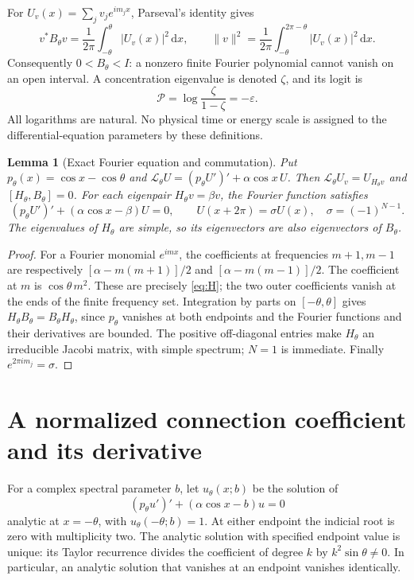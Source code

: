 \documentclass[10pt]{article}
\newtheorem{lemma}[theorem]{Lemma}
\newcommand{\dd}{\mathrm d}
\begin{document}
For $U_v(x)=\sum_j v_j e^{im_jx}$, Parseval's identity gives
\begin{equation}
v^*B_\theta v=\frac1{2\pi}\int_{-\theta}^{\theta}|U_v(x)|^2\,\dd x,
\qquad
\|v\|^2=\frac1{2\pi}\int_{-\theta}^{2\pi-\theta}|U_v(x)|^2\,\dd x.
\label{eq:parseval}
\end{equation}
Consequently $0<B_\theta<I$: a nonzero finite Fourier polynomial cannot
vanish on an open interval. A concentration eigenvalue is denoted $\zeta$,
and its logit is
\begin{equation}
\mathcal P=\log\frac{\zeta}{1-\zeta}=-\varepsilon.
\label{eq:logit}
\end{equation}
All logarithms are natural. No physical time or energy scale is assigned
to the differential-equation parameters by these definitions.

\begin{lemma}[Exact Fourier equation and commutation]
Put $p_\theta(x)=\cos x-\cos\theta$ and
$\mathcal L_\theta U=(p_\theta U')'+\alpha\cos x\,U$.
Then $\mathcal L_\theta U_v=U_{H_\theta v}$ and
$[H_\theta,B_\theta]=0$.
For each eigenpair $H_\theta v=\beta v$, the Fourier function satisfies
\begin{equation}
(p_\theta U')'+(\alpha\cos x-\beta)U=0,\qquad
U(x+2\pi)=\sigma U(x),\quad \sigma=(-1)^{N-1}.
\label{eq:ode}
\end{equation}
The eigenvalues of $H_\theta$ are simple, so its eigenvectors are also
eigenvectors of $B_\theta$.
\end{lemma}
\begin{proof}
For a Fourier monomial $e^{imx}$, the coefficients at frequencies $m+1,m-1$
are respectively $[\alpha-m(m+1)]/2$ and $[\alpha-m(m-1)]/2$.
The coefficient at $m$ is $\cos\theta\,m^2$. These are precisely
\eqref{eq:H}; the two outer coefficients vanish at the ends of the finite
frequency set. Integration by parts on $[-\theta,\theta]$ gives
$H_\theta B_\theta=B_\theta H_\theta$, since $p_\theta$ vanishes at
both endpoints and the Fourier functions and their derivatives are bounded.
The positive off-diagonal entries make $H_\theta$ an irreducible Jacobi
matrix, with simple spectrum; $N=1$ is immediate.
Finally $e^{2\pi i m_j}=\sigma$.
\end{proof}

\section{A normalized connection coefficient and its derivative}
For a complex spectral parameter $b$, let $u_\theta(x;b)$ be the solution of
\begin{equation}
(p_\theta u')'+(\alpha\cos x-b)u=0
\label{eq:param}
\end{equation}
analytic at $x=-\theta$, with $u_\theta(-\theta;b)=1$.
At either endpoint the indicial root is zero with multiplicity two.
The analytic solution with specified endpoint value is unique:
its Taylor recurrence divides the coefficient of degree $k$ by
$k^2\sin\theta\ne0$. In particular, an analytic solution that vanishes
at an endpoint vanishes identically.
\end{document}
